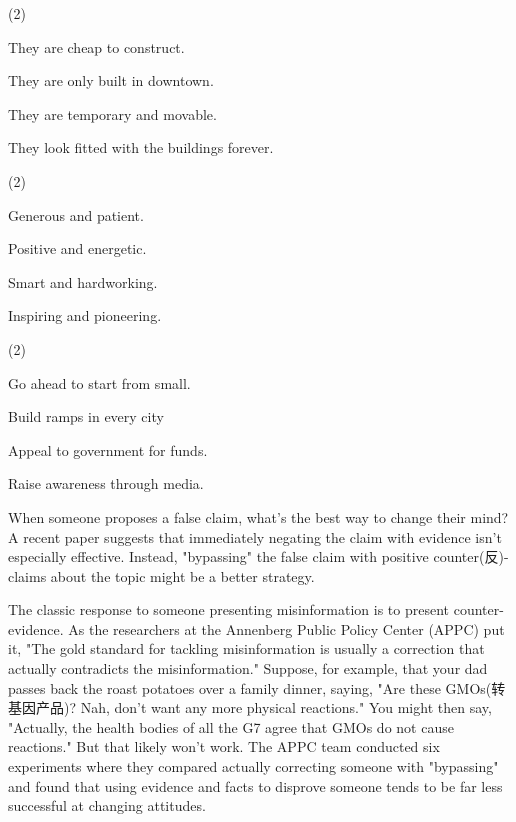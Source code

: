 \documentclass{英语试卷}
\begin{document}
\begin{choices}(2)
  \item They are cheap to construct.
  \item They are only built in downtown.
  \item They are temporary and movable.
  \item They look fitted with the buildings forever.
\end{choices}
\begin{choices}(2)
  \item Generous and patient.
  \item Positive and energetic.
  \item Smart and hardworking.
  \item Inspiring and pioneering.
\end{choices}
\begin{choices}(2)
  \item Go ahead to start from small.
  \item Build ramps in every city
  \item Appeal to government for funds.
  \item Raise awareness through media.
\end{choices}
\par When someone proposes a false claim, what's the best way to change their mind? A recent paper suggests that immediately negating the claim with evidence isn't especially effective. Instead, "bypassing" the false claim with positive counter(反)-claims about the topic might be a better strategy.\par
\par The classic response to someone presenting misinformation is to present counter-evidence. As the researchers at the Annenberg Public Policy Center (APPC) put it, "The gold standard for tackling misinformation is usually a correction that actually contradicts the misinformation." Suppose, for example, that your dad passes back the roast potatoes over a family dinner, saying, "Are these GMOs(转基因产品)? Nah, don’t want any more physical reactions." You might then say, "Actually, the health bodies of all the G7 agree that GMOs do not cause reactions." But that likely won't work. The APPC team conducted six experiments where they compared actually correcting someone with "bypassing" and found that using evidence and facts to disprove someone tends to be far less successful at changing attitudes.\par
\end{document}
